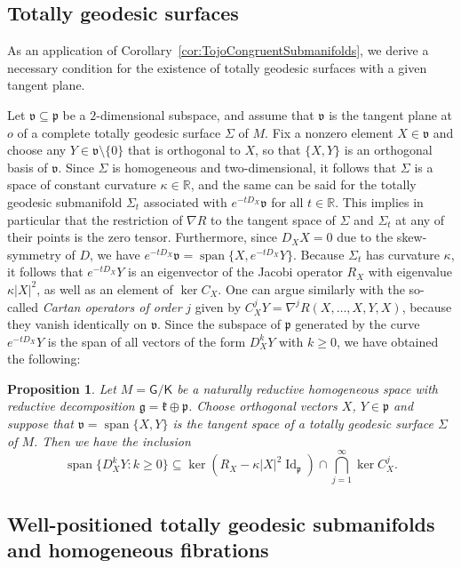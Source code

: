 \documentclass[11pt,a4paper,final]{amsart}
\newcommand{\g}{\mathfrak}
\newcommand{\R}{\mathbb{R}}
\newcommand{\vecspan}{\operatorname{span}}
\newcommand{\spann}{\operatorname{span}}
\newtheorem{proposition}[theorem]{Proposition}
\theoremstyle{definition}
\begin{document}
\subsection{Totally geodesic surfaces}\label{subsec:tgsurf}

As an application of Corollary~\ref{cor:TojoCongruentSubmanifolds}, we derive a necessary condition for the existence of totally geodesic surfaces with a given tangent plane.

Let $\g{v}\subseteq \g{p}$ be a $2$-dimensional  subspace, and assume that $\g{v}$ is the tangent plane at $o$ of a complete totally geodesic surface $\Sigma$ of $M$.
Fix a nonzero element $X\in \g{v}$ and choose any $Y\in \g{v}\setminus \{0\}$ that is orthogonal to $X$, so that $\{X,Y\}$ is an orthogonal basis of $\g{v}$.
Since $\Sigma$ is homogeneous and two-dimensional, it follows that $\Sigma$ is a space of constant curvature $\kappa\in \R$, and the same can be said for the totally geodesic submanifold $\Sigma_{t}$ associated with $e^{-tD_{X}}\g{v}$ for all $t\in\R$.
This implies in particular that the restriction of $\nabla R$ to the tangent space of $\Sigma$ and $\Sigma_{t}$ at any of their points is the zero tensor.
Furthermore, since $D_{X}X=0$ due to the skew-symmetry of $D$, we have $e^{-t D_{X}}\g{v}=\vecspan\{X,e^{-t D_{X}}Y\}$.
Because $\Sigma_{t}$ has curvature $\kappa$, it follows that $e^{-t  D_{X}}Y$ is an eigenvector of the Jacobi operator $R_{X}$ with eigenvalue $\kappa \lvert X \rvert^{2}$, as well as an element of $\ker C_{X}$.
One can argue similarly with the so-called \textit{Cartan operators of order} $j$ given by $C^j_XY=\nabla^jR(X,\dots,X,Y,X)$, because they vanish identically on $\g{v}$.
Since the subspace of $\g{p}$ generated by the curve $e^{-t D _{X}} Y$ is the span of all vectors of the form $D_{X}^{k}Y$ with $k\geq 0$, we have obtained the following:


\begin{proposition}\label{prop:TojoSurfaces}
	Let $M=\mathsf{G}/\mathsf{K}$ be a naturally reductive homogeneous space with reductive decomposition $\g{g}=\g{k}\oplus \g{p}$.
	Choose orthogonal vectors $X$, $Y\in \g{p}$ and suppose that $\g{v}=\vecspan\{X,Y\}$ is the tangent space of a totally geodesic surface $\Sigma$ of $M$.
	Then we have the inclusion
	\[
	\spann \{ D_{X}^{k}Y\colon k\geq 0 \}\subseteq \ker (R_{X}-\kappa\lvert X \rvert^{2}\operatorname{Id}_{\g{p}})\cap\bigcap_{j= 1}^{\infty}\ker C_{X}^{j}.
	\]
\end{proposition}

\subsection{Well-positioned totally geodesic submanifolds and homogeneous fibrations}\label{subsec:wellpostg}
\end{document}
